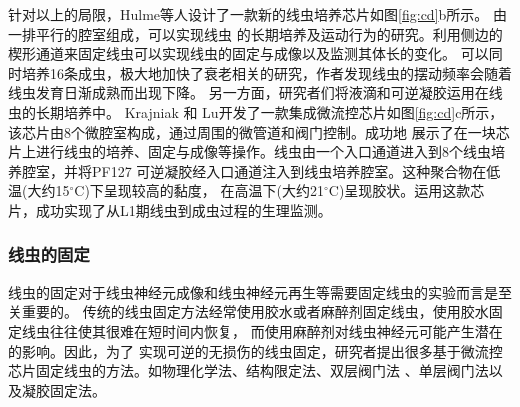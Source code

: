 	针对以上的局限，Hulme等人\cite{Hulme2010Lifespan}设计了一款新的线虫培养芯片如图\ref{fig:cd}b所示。
	由一排平行的腔室组成，可以实现线虫
	的长期培养及运动行为的研究。利用侧边的楔形通道来固定线虫可以实现线虫的固定与成像以及监测其体长的变化。
	可以同时培养16条成虫，极大地加快了衰老相关的研究，作者发现线虫的摆动频率会随着线虫发育日渐成熟而出现下降。
	另一方面，研究者们将液滴和可逆凝胶运用在线虫的长期培养中\cite{Aubry2015Hydrogel,Krajniak2010Long,Wen2015A,Cornaglia2016Automated}。
	Krajniak 和 Lu\cite{Krajniak2010Long}开发了一款集成微流控芯片如图\ref{fig:cd}c所示，该芯片由8个微腔室构成，通过周围的微管道和阀门控制。成功地
	展示了在一块芯片上进行线虫的培养、固定与成像等操作。线虫由一个入口通道进入到8个线虫培养腔室，并将PF127
	可逆凝胶经入口通道注入到线虫培养腔室。这种聚合物在低温(大约15$^\circ$C)下呈现较高的黏度，
	在高温下(大约21$^\circ$C)呈现胶状。运用这款芯片，成功实现了从L1期线虫到成虫过程的生理监测。
\subsubsection{线虫的固定}
\label{sec:intro:analog}
	线虫的固定对于线虫神经元成像和线虫神经元再生\cite{Gokce2014A}等需要固定线虫的实验而言是至关重要的。
	传统的线虫固定方法经常使用胶水或者麻醉剂固定线虫，使用胶水固定线虫往往使其很难在短时间内恢复，
	而使用麻醉剂对线虫神经元可能产生潜在的影响。因此，为了
	实现可逆的无损伤的线虫固定，研究者提出很多基于微流控芯片固定线虫的方法。如物理化学法、结构限定法、双层阀门法
	、单层阀门法以及凝胶固定法。
	
